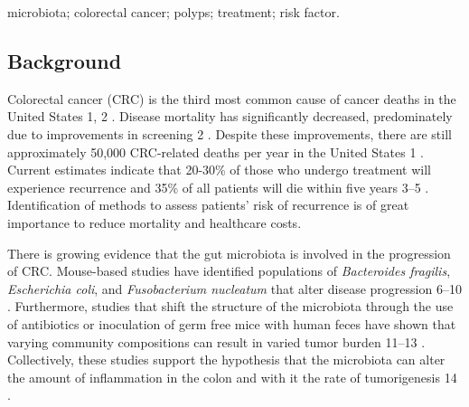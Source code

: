 \documentclass[12pt,]{article}
\providecommand{\DIFaddtex}[1]{{\protect\color{blue}\uwave{#1}}} %
\providecommand{\DIFaddbegin}{} %
\providecommand{\DIFaddend}{} %
\providecommand{\DIFdelbegin}{} %
\providecommand{\DIFdelend}{} %
\providecommand{\DIFadd}[1]{\texorpdfstring{\DIFaddtex{#1}}{#1}} %
\begin{document}
microbiota; colorectal cancer; polyps; treatment; risk factor.

\newpage

\subsection{Background}\label{background}

Colorectal cancer (CRC) is the third most common cause of cancer deaths
in the United States \DIFdelbegin %
\DIFdelend \DIFaddbegin \DIFadd{(}\DIFaddend 1, 2\DIFdelbegin %
\DIFdelend \DIFaddbegin \DIFadd{)}\DIFaddend . Disease mortality has significantly
decreased, predominately due to improvements in screening \DIFdelbegin %
\DIFdelend \DIFaddbegin \DIFadd{(}\DIFaddend 2\DIFdelbegin %
\DIFdelend \DIFaddbegin \DIFadd{)}\DIFaddend . Despite
these improvements, there are still approximately 50,000 CRC-related
deaths per year in the United States \DIFdelbegin %
\DIFdelend \DIFaddbegin \DIFadd{(}\DIFaddend 1\DIFdelbegin %
\DIFdelend \DIFaddbegin \DIFadd{)}\DIFaddend . Current estimates indicate
that 20-30\% of those who undergo treatment will experience recurrence
and 35\% of all patients will die within five years \DIFdelbegin %
\DIFdelend \DIFaddbegin \DIFadd{(}\DIFaddend 3--5\DIFdelbegin %
\DIFdelend \DIFaddbegin \DIFadd{)}\DIFaddend .
Identification of methods to assess patients' risk of recurrence is of
great importance to reduce mortality and healthcare costs.

There is growing evidence that the gut microbiota is involved in the
progression of CRC. Mouse-based studies have identified populations of
\emph{Bacteroides fragilis}, \emph{Escherichia coli}, and
\emph{Fusobacterium nucleatum} that alter disease progression \DIFdelbegin %
\DIFdelend \DIFaddbegin \DIFadd{(}\DIFaddend 6--10\DIFdelbegin %
\DIFdelend \DIFaddbegin \DIFadd{)}\DIFaddend .
Furthermore, studies that shift the structure of the microbiota through
the use of antibiotics or inoculation of germ free mice with human feces
have shown that varying community compositions can result in varied
tumor burden \DIFdelbegin %
\DIFdelend \DIFaddbegin \DIFadd{(}\DIFaddend 11--13\DIFdelbegin %
\DIFdelend \DIFaddbegin \DIFadd{)}\DIFaddend . Collectively, these studies support the
hypothesis that the microbiota can alter the amount of inflammation in
the colon and with it the rate of tumorigenesis \DIFdelbegin %
\DIFdelend \DIFaddbegin \DIFadd{(}\DIFaddend 14\DIFdelbegin %
\DIFdelend \DIFaddbegin \DIFadd{)}\DIFaddend .
\end{document}
